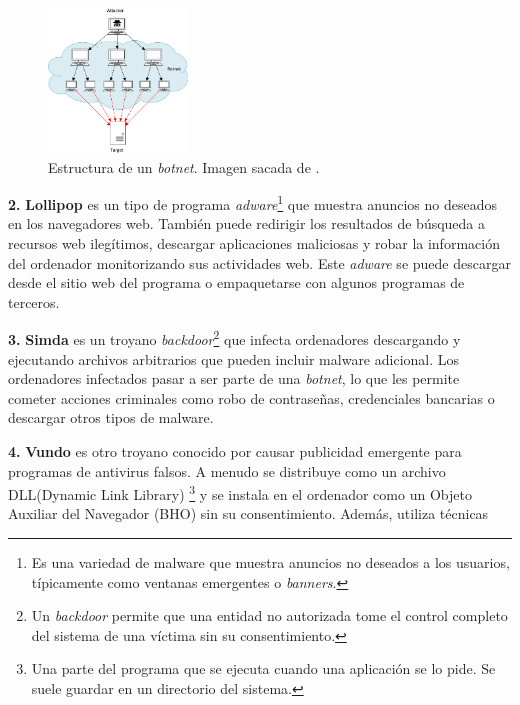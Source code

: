 \begin{figure}
  \begin{center}
    \includegraphics[width=0.33\textwidth]{img/botnetStructure.png}
  \end{center}
    \caption{Estructura de un \textit{botnet}. Imagen sacada de \citep{botnetstructure}.}
  \label{fig:botnetstructure}
\end{figure}
\vspace{-\baselineskip}

\bigskip
\textbf{2.} \textbf{Lollipop} es un tipo de programa \textit{adware}\footnote{Es una variedad de malware que muestra anuncios no deseados a los usuarios, típicamente como ventanas emergentes o \textit{banners}.} que muestra anuncios no deseados en los navegadores web. También puede redirigir los resultados de búsqueda a recursos web ilegítimos, descargar aplicaciones maliciosas y robar la información del ordenador monitorizando sus actividades web. Este \textit{adware} se puede descargar desde el sitio web del programa o empaquetarse con algunos programas de terceros.


\textbf{3.} \textbf{Simda} es un troyano \textit{backdoor}\footnote{Un \textit{backdoor} permite que una entidad no autorizada tome el control completo del sistema de una víctima sin su consentimiento.} que infecta ordenadores descargando y ejecutando archivos arbitrarios que pueden incluir malware adicional. Los ordenadores infectados pasar a ser parte de una \textit{botnet}, lo que les permite cometer acciones criminales como robo de contraseñas, credenciales bancarias o descargar otros tipos de malware.

\textbf{4.} \textbf{Vundo} es otro troyano conocido por causar publicidad emergente para programas de antivirus falsos. A menudo se distribuye como un archivo DLL(Dynamic Link Library) \footnote{Una parte del programa que se ejecuta cuando una aplicación se lo pide. Se suele guardar en un directorio del sistema.} y se instala en el ordenador como un Objeto Auxiliar del Navegador (BHO) sin su consentimiento. Además, utiliza técnicas

